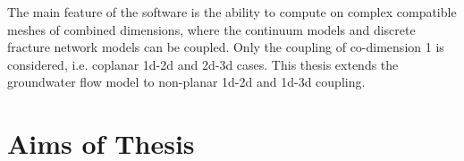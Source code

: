 The main feature of the software is the ability to compute on complex compatible meshes of combined dimensions,
where the continuum models and discrete fracture network models can be coupled. Only the coupling of co-dimension 1
is considered, i.e. coplanar 1d-2d and 2d-3d cases.
This thesis extends the groundwater flow model to non-planar 1d-2d and 1d-3d coupling.
%




\section{Aims of Thesis}\label{chap:aims}



